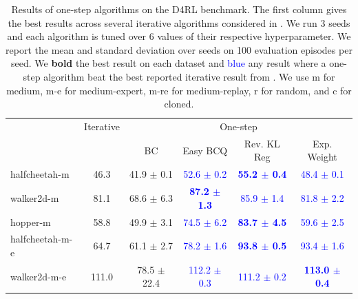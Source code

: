 \begin{table}[h]
    \centering
    \caption{Results of one-step algorithms on the D4RL benchmark. The first column gives the best results across several iterative algorithms considered in \cite{fu2020d4rl}. We run 3 seeds and each algorithm is tuned over 6 values of their respective hyperparameter. We report the mean and standard deviation over seeds on 100 evaluation episodes per seed. We \textbf{bold} the best result on each dataset and \textcolor{blue}{blue} any result where a one-step algorithm beat the best reported iterative result from \cite{fu2020d4rl}. We use m for medium, m-e for medium-expert, m-re for medium-replay, r for random, and c for cloned.}
    \begin{small}
    \begin{tabular}{lccccc}
        \toprule & Iterative & \multicolumn{4}{c}{One-step}\\
        \cmidrule(lr){2-2} \cmidrule(lr){3-6}
         & \cite{fu2020d4rl} & BC & Easy BCQ  & Rev. KL Reg & Exp. Weight \\
        \midrule
        halfcheetah-m & 46.3 &
                        41.9  $\pm$  0.1 &
                        \textcolor{blue}{52.6  $\pm$  0.2}  &
                        \textcolor{blue}{\textbf{55.2  $\pm$  0.4 }} &
                        \textcolor{blue}{48.4  $\pm$  0.1} \\
        walker2d-m & 81.1 &
                        68.6  $\pm$  6.3 &
                        \textcolor{blue}{\textbf{87.2  $\pm$  1.3}} &
                        \textcolor{blue}{85.9  $\pm$  1.4} &
                        \textcolor{blue}{81.8  $\pm$  2.2}  \\
        hopper-m & 58.8 &
                        49.9  $\pm$  3.1 &
                        \textcolor{blue}{74.5  $\pm$  6.2}&
                        \textcolor{blue}{\textbf{83.7  $\pm$  4.5}} &
                        \textcolor{blue}{59.6  $\pm$  2.5}\\
        \midrule
        halfcheetah-m-e & 64.7 &
                        61.1  $\pm$  2.7 &
                        \textcolor{blue}{78.2  $\pm$  1.6}  &
                        \textcolor{blue}{\textbf{93.8  $\pm$  0.5}} &
                        \textcolor{blue}{93.4  $\pm$  1.6} \\
        walker2d-m-e & 111.0 &
                        78.5  $\pm$  22.4 &
                        \textcolor{blue}{112.2  $\pm$  0.3}   &
                        \textcolor{blue}{111.2  $\pm$  0.2}  &
                        \textcolor{blue}{\textbf{113.0  $\pm$  0.4}}  \\

\end{tabular}
\end{small}
\end{table}
